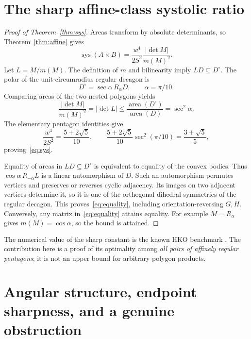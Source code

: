 \documentclass[11pt,a4paper]{article}
\theoremstyle{definition}\newtheorem{definition}[theorem]{Definition}
\theoremstyle{remark}\newtheorem{remark}[theorem]{Remark}
\newcommand{\area}{\operatorname{area}}
\newcommand{\sys}{\operatorname{sys}}
\begin{document}
\section{The sharp affine-class systolic ratio}\label{sec:sys}
\begin{proof}[Proof of Theorem~\ref{thm:sys}]
Areas transform by absolute determinants, so Theorem~\ref{thm:affine} gives
\begin{equation}\label{eq:sys-matrix}
 \sys(A\times B)=\frac{w^4}{2S^2}\frac{|\det M|}{m(M)^2}.
\end{equation}
Let $L=M/m(M)$. The definition of $m$ and bilinearity imply $LD\subseteq D^\circ$. The polar of the unit-circumradius regular decagon is
\[
 D^\circ=\sec\alpha\,R_\alpha D,\qquad \alpha=\pi/10.
\]
Comparing areas of the two nested polygons yields
\[
 \frac{|\det M|}{m(M)^2}=|\det L|
 \le\frac{\area(D^\circ)}{\area(D)}=\sec^2\alpha.
\]
The elementary pentagon identities give
\[
 \frac{w^4}{2S^2}=\frac{5+2\sqrt5}{10},\qquad
 \frac{5+2\sqrt5}{10}\sec^2(\pi/10)=\frac{3+\sqrt5}{5},
\]
proving~\eqref{eq:sys}.

Equality of areas in $LD\subseteq D^\circ$ is equivalent to equality of the convex bodies. Thus $\cos\alpha\,R_{-\alpha}L$ is a linear automorphism of $D$. Such an automorphism permutes vertices and preserves or reverses cyclic adjacency. Its images on two adjacent vertices determine it, so it is one of the orthogonal dihedral symmetries of the regular decagon. This proves~\eqref{eq:equality}, including orientation-reversing $G,H$. Conversely, any matrix in~\eqref{eq:equality} attains equality. For example $M=R_\alpha$ gives $m(M)=\cos\alpha$, so the bound is attained.
\end{proof}

The numerical value of the sharp constant is the known HKO benchmark \cite{HKO}. The contribution here is a proof of its optimality among \emph{all pairs of affinely regular pentagons}; it is not an upper bound for arbitrary polygon products.

\section{Angular structure, endpoint sharpness, and a genuine obstruction}\label{sec:angular}
\end{document}
